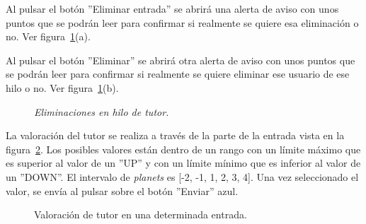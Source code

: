 \documentclass[a4paper, 12pt]{book}
\begin{document}
Al pulsar el bot\'on ''Eliminar entrada'' se abrir\'a una alerta de aviso con unos puntos que se podr\'an leer para confirmar si realmente se quiere esa 
eliminaci\'on o no. Ver figura~\ref{figura:hiloprofesor1}(a).

Al pulsar el bot\'on ''Eliminar'' se abrir\'a otra alerta de aviso con unos puntos que se podr\'an leer para confirmar si realmente se quiere eliminar ese
usuario de ese hilo o no. Ver figura~\ref{figura:hiloprofesor1}(b).
\begin{figure}
  \centering
  \caption{\textit{Eliminaciones en hilo de tutor.}}
  \label{figura:hiloprofesor1}
\end{figure}

La valoraci\'on del tutor se realiza a trav\'es de la parte de la entrada vista en la figura~\ref{figura:hiloprofesor2}. Los posibles valores est\'an dentro
de un rango con un l\'imite m\'aximo que es superior al valor de un ''UP'' y con un l\'imite m\'inimo que es inferior al valor de un ''DOWN''. El intervalo de
\textit{planets} es [-2, -1, 1, 2, 3, 4]. Una vez seleccionado el valor, se env\'ia al pulsar sobre el bot\'on ''Enviar'' azul.
\begin{figure}[htbp] 
  \centering
  \caption{Valoraci\'on de tutor en una determinada entrada.}
  \label{figura:hiloprofesor2}
\end{figure}
\end{document}
